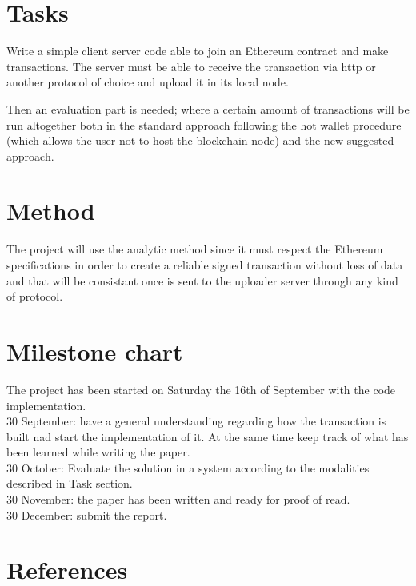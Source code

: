 \documentclass[paper=a4, fontsize=11pt]{scrartcl} %
\numberwithin{equation}{section} %
\numberwithin{figure}{section} %
\numberwithin{table}{section} %
\begin{document}
\section{Tasks}

Write a simple client server code able to join an Ethereum contract and make transactions.
The server must be able to receive the transaction via http or another protocol of choice and upload it in its local node.

Then an evaluation part is needed; where a certain amount of transactions will be run altogether both in the standard approach following the hot wallet procedure (which allows the user not to host the blockchain node) and the new suggested approach.

\section{Method}

The project will use the analytic method since it must respect the Ethereum specifications in order to create a reliable signed transaction without loss of data and that will be consistant once is sent to the uploader server through any kind of protocol.

\section{Milestone chart}

The project has been started on Saturday the 16th of September with the code implementation. \\

30 September: have a general understanding regarding how the transaction is built nad start the implementation of it. At the same time keep track of what has been learned while writing the paper. \\

30 October: Evaluate the solution in a system according to the modalities described in Task section. \\

30 November: the paper has been written and ready for proof of read. \\

30 December: submit the report. \\

\section{References}
\end{document}
